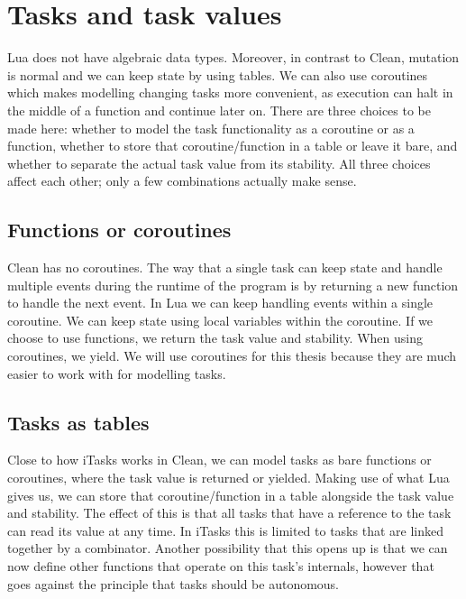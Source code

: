 \section{Tasks and task values}\label{section-task-values}
Lua does not have algebraic data types. Moreover, in contrast to Clean, mutation is normal and we can keep state by using tables. We can also use coroutines which makes modelling changing tasks more convenient, as execution can halt in the middle of a function and continue later on. There are three choices to be made here: whether to model the task functionality as a coroutine or as a function, whether to store that coroutine/function in a table or leave it bare, and whether to separate the actual task value from its stability. All three choices affect each other; only a few combinations actually make sense.

\subsection{Functions or coroutines}\label{section-task-values-fn-coroutine}
Clean has no coroutines. The way that a single task can keep state and handle multiple events during the runtime of the program is by returning a new function to handle the next event. In Lua we can keep handling events within a single coroutine. We can keep state using local variables within the coroutine. If we choose to use functions, we return the task value and stability. When using coroutines, we yield. We will use coroutines for this thesis because they are much easier to work with for modelling tasks.

\subsection{Tasks as tables}
Close to how iTasks works in Clean, we can model tasks as bare functions or coroutines, where the task value is returned or yielded. Making use of what Lua gives us, we can store that coroutine/function in a table alongside the task value and stability. The effect of this is that all tasks that have a reference to the task can read its value at any time. In iTasks this is limited to tasks that are linked together by a combinator. Another possibility that this opens up is that we can now define other functions that operate on this task's internals, however that goes against the principle that tasks should be autonomous.

